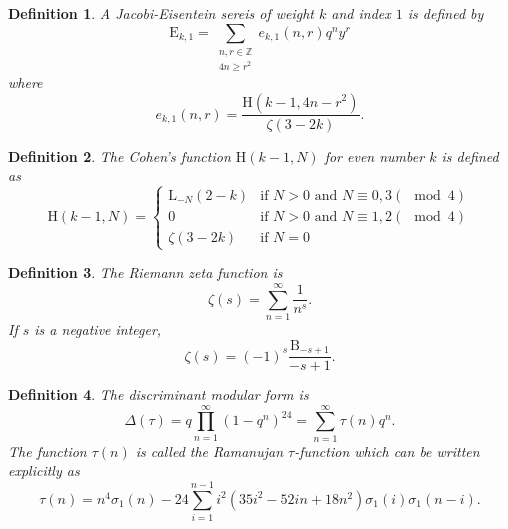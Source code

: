\documentclass[uplatex,dvipdfmx]{jsarticle}
\newtheorem{definition}{Definition}[section]
\begin{document}
\begin{definition}
    A Jacobi-Eisentein sereis of weight
    $k$
    and index
    $1$
    is defined by
    \begin{equation}
        \mathrm{E}_{k, 1}
        =
        \sum_{\substack{n, r \in \mathbb{Z} \\ 4n \geq r^2}}
        e_{k, 1}(n, r)
        q^n y^r
    \end{equation}
    where
    \begin{equation}
        e_{k, 1}(n, r)
        =
        \frac{\mathrm{H}\left( k - 1, 4n - r^2 \right)}
        {\zeta(3 - 2k)}.
    \end{equation}
\end{definition}

\begin{definition}
    The Cohen's function
    $\mathrm{H}(k - 1, N)$
    for even number
    $k$
    is defined as
    \begin{equation}
        \mathrm{H}(k - 1, N)
        =
        \begin{cases}
            \mathrm{L}_{-N}(2 - k)
            &\text{if $N > 0$ and $N \equiv 0, 3 (\mod 4)$}\\
            0
            &\text{if $N > 0$ and $N \equiv 1, 2 (\mod 4)$}\\
            \zeta(3 - 2k)
            &\text{if $N = 0$}
        \end{cases}
    \end{equation}
\end{definition}

\begin{definition}
    The Riemann zeta function is
    \begin{equation}
        \zeta (s)
        =
        \sum_{n = 1}^\infty
        \frac{1}{n^s}.
    \end{equation}
    If
    $s$
    is a negative integer,
    \begin{equation}
        \zeta(s)
        =
        (-1)^s \frac{\mathrm{B}_{-s + 1}}{-s + 1}.
    \end{equation}
\end{definition}

\begin{definition}
    The discriminant modular form is
    \begin{equation}
        \Delta(\tau)
        =
        q \prod_{n = 1}^\infty (1 - q^n)^{24}
        =
        \sum_{n = 1}^\infty
        \tau (n) q^n.
    \end{equation}
    The function 
    $\tau(n)$ is called the Ramanujan $\tau$-function
    which can be written explicitly as
    \begin{equation}
        \tau(n)
        =
        n^4 \sigma_1 (n)
        - 24
        \sum_{i = 1}^{n - 1}
        i^2 (35i^2 - 52in + 18n^2)
        \sigma_1 (i)
        \sigma_1 (n - i).
    \end{equation}
\end{definition}
\end{document}
